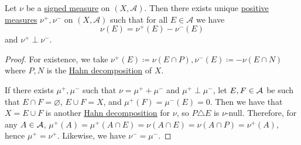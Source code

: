 \begin{theorem}\label{thm:Jordan-decomposition-theorem}
	Let \(\nu\) be a \hyperref[def:signed-measure]{signed measure} on \((X, \mathcal{A})\). Then there exists unique \hyperref[def:measure]{positive measures} \(\nu^+,\nu^-\)
	on \((X, \mathcal{A})\) such that for all \(E \in \mathcal{A}\) we have
	\[
		\nu(E) = \nu^+(E) - \nu^-(E)
	\]
	and \(\nu^+ \perp \nu^-\).
\end{theorem}
\begin{proof}
	For existence, we take \(\nu^+(E) \coloneqq \nu(E \cap P), \nu^-(E) \coloneqq -\nu(E \cap N)\) where \(P, N\) is the
	\hyperref[thm:Hahn-decomposition-theorem]{Hahn decomposition} of \(X\).

	If there exists \(\mu ^+, \mu ^-\) such that \(\nu = \mu ^+ + \mu ^-\) and \(\mu ^+ \perp \mu ^-\), let \(E, F\in \mathcal{\MakeUppercase{a}} \) be
	such that \(E\cap F = \varnothing \), \(E\cup F= X\), and \(\mu ^+(F) = \mu ^-(E) = 0\). Then we have that \(X = E \cup F\) is another
	\hyperref[thm:Hahn-decomposition-theorem]{Hahn decomposition} for \(\nu \), so \(P\triangle E\) is \(\nu\)-null. Therefore, for any
	\(A \in \mathcal{\MakeUppercase{a}} \), \(\mu ^+(A) = \mu ^+(A \cap E) = \nu (A \cap E) = \nu (A \cap P) = \nu ^+(A)\), hence \(\mu ^+ = \nu ^+\).
	Likewise, we have \(\nu ^- = \mu ^-\).
\end{proof}